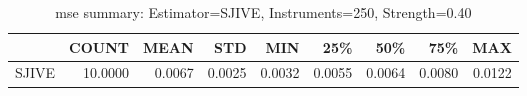 \begin{table}[ht]
\centering
\caption{mse summary: Estimator=SJIVE, Instruments=250, Strength=0.40}
\begin{tabular}{lrrrrrrrr}
\toprule
 & COUNT & MEAN & STD & MIN & 25\% & 50\% & 75\% & MAX \\
\midrule
SJIVE & 10.0000 & 0.0067 & 0.0025 & 0.0032 & 0.0055 & 0.0064 & 0.0080 & 0.0122 \\
\bottomrule
\end{tabular}
\end{table}
